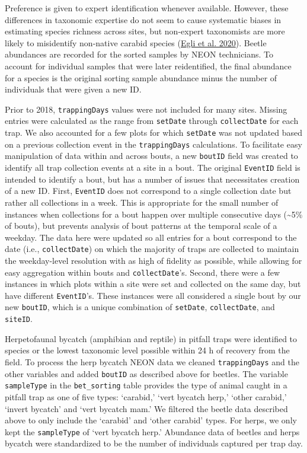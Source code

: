 \documentclass[
  12pt,
]{article}
\begin{document}
Preference is given to expert identification whenever available. However, these differences in taxonomic expertise do not seem to cause systematic biases in estimating species richness across sites, but non-expert taxonomists are more likely to misidentify non-native carabid species (\protect\hyperlink{ref-egli2020taxonomic}{Egli et al. 2020}). Beetle abundances are recorded for the sorted samples by NEON technicians. To account for individual samples that were later reidentified, the final abundance for a species is the original sorting sample abundance minus the number of individuals that were given a new ID.

Prior to 2018, \texttt{trappingDays} values were not included for many sites. Missing entries were calculated as the range from \texttt{setDate} through \texttt{collectDate} for each trap. We also accounted for a few plots for which \texttt{setDate} was not updated based on a previous collection event in the \texttt{trappingDays} calculations. To facilitate easy manipulation of data within and across bouts, a new \texttt{boutID} field was created to identify all trap collection events at a site in a bout. The original \texttt{EventID} field is intended to identify a bout, but has a number of issues that necessitates creation of a new ID. First, \texttt{EventID} does not correspond to a single collection date but rather all collections in a week. This is appropriate for the small number of instances when collections for a bout happen over multiple consecutive days (\textasciitilde5\% of bouts), but prevents analysis of bout patterns at the temporal scale of a weekday. The data here were updated so all entries for a bout correspond to the date (i.e., \texttt{collectDate}) on which the majority of traps are collected to maintain the weekday-level resolution with as high of fidelity as possible, while allowing for easy aggregation within bouts and \texttt{collectDate}'s. Second, there were a few instances in which plots within a site were set and collected on the same day, but have different \texttt{EventID}'s. These instances were all considered a single bout by our new \texttt{boutID}, which is a unique combination of \texttt{setDate}, \texttt{collectDate}, and \texttt{siteID}.

Herpetofaunal bycatch (amphibian and reptile) in pitfall traps were identified to species or the lowest taxonomic level possible within 24 h of recovery from the field. To process the herp bycatch NEON data we cleaned \texttt{trappingDays} and the other variables and added \texttt{boutID} as described above for beetles. The variable \texttt{sampleType} in the \texttt{bet\_sorting} table provides the type of animal caught in a pitfall trap as one of five types: `carabid,' `vert bycatch herp,' `other carabid,' `invert bycatch' and `vert bycatch mam.' We filtered the beetle data described above to only include the `carabid' and `other carabid' types. For herps, we only kept the \texttt{sampleType} of `vert bycatch herp.' Abundance data of beetles and herps bycatch were standardized to be the number of individuals captured per trap day.
\end{document}
